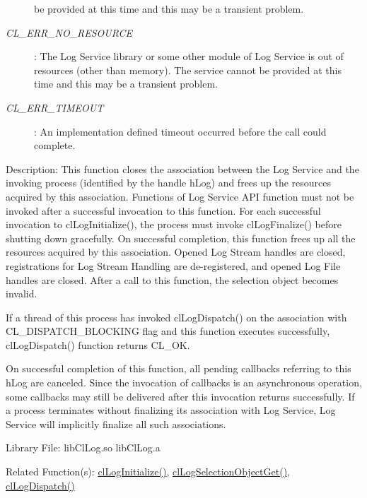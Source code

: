 \begin{flushleft}
\begin{Desc}
\begin{description}
be provided at this time and this may be a transient problem.
\item[{\em CL\_\-ERR\_\-NO\_\-RESOURCE}]:  The Log Service library or some other module of Log Service is out of resources 
(other than memory). The service cannot be provided at this time and this may be a transient problem.
\item[{\em CL\_\-ERR\_\-TIMEOUT}]: An implementation defined timeout occurred before the call could complete.
\end{description}
\end{Desc}
\begin{Desc}
\item[Description:] This function closes the association between the Log Service and the invoking process (identified by the handle hLog) and frees up
the resources acquired by this association. Functions of Log Service API function must not be invoked after a successful invocation to this 
function. For each successful invocation to clLogInitialize(), the process must invoke clLogFinalize() before shutting down gracefully. 
On successful completion, this function frees up all the resources acquired by this association. Opened Log Stream handles are closed, 
registrations for Log Stream Handling are de-registered, and opened Log File handles are closed. After a call to this function, the selection object 
becomes invalid.
\par
If a thread of this process has invoked clLogDispatch() on the association with CL\_\-DISPATCH\_\-BLOCKING flag and this function executes successfully,
clLogDispatch() function returns CL\_\-OK. 
\par
On successful completion of this function, all pending callbacks referring to this hLog are canceled. Since the invocation of callbacks is an 
asynchronous operation, some callbacks may still be delivered after this invocation returns successfully.
If a process terminates without finalizing its association with Log Service, Log Service will implicitly finalize all such associations.
\end{Desc}
\begin{Desc}
\item[Library File:] libClLog.so
\newline
libClLog.a
\end{Desc}
\begin{Desc}
\item[Related Function(s):]\hyperlink{pagelog101}{clLogInitialize()}, \hyperlink{pagelog103}{clLogSelectionObjectGet()}, \hyperlink{pagelog104}{clLogDispatch()}\end{Desc}
\newpage






\end{flushleft}
